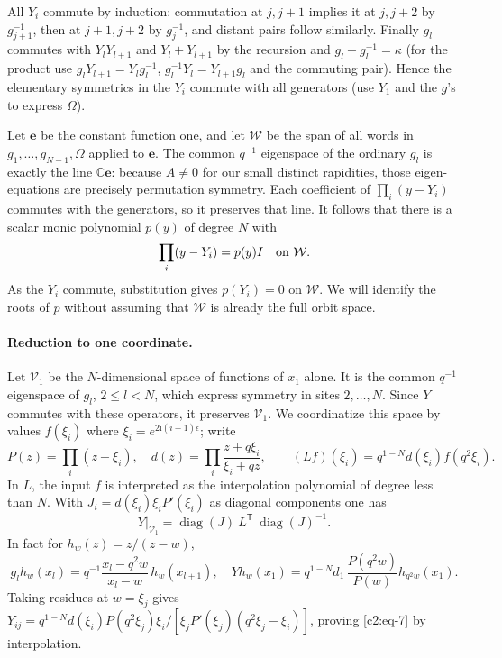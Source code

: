 All $Y_i$ commute by induction: commutation at \(j,j+1\) implies it at \(j,j+2\) by \(g_{j+1}^{-1}\), then at \(j+1,j+2\) by \(g_j^{-1}\), and distant pairs follow similarly. Finally $g_l$ commutes with \(Y_l Y_{l+1}\) and \(Y_l+Y_{l+1}\) by the recursion and \(g_l-g_l^{-1}=\kappa\) (for the product use \(g_lY_{l+1}=Y_l g_l^{-1}\), \(g_l^{-1}Y_l=Y_{l+1}g_l\) and the commuting pair). Hence the elementary symmetrics in the \(Y_i\) commute with all generators (use \(Y_1\) and the \(g\)'s to express \(\Omega\)).

Let $\mathbf e$ be the constant function one, and let $\mathcal W$
be the span of all words in $g_1,\ldots,g_{N-1},\Omega$ applied to
$\mathbf e$.  The common $q^{-1}$ eigenspace of the ordinary $g_l$ is
exactly the line $\mathbb C\mathbf e$: because $A\ne0$ for our small
distinct rapidities, those eigen-equations are precisely permutation
symmetry.  Each coefficient of $\prod_i(y-Y_i)$ commutes with the
generators, so it preserves that line.  It follows that there is a scalar
monic polynomial $p(y)$ of degree $N$ with
\[
 \prod_i(y-Y_i)=p(y)I\quad\hbox{on }\mathcal W.
\]
As the $Y_i$ commute, substitution gives $p(Y_i)=0$ on $\mathcal W$.
We will identify the roots of $p$ without assuming that $\mathcal W$
is already the full orbit space.

\paragraph{Reduction to one coordinate.}
Let $\mathcal V_1$ be the $N$-dimensional space of functions of $x_1$
alone.  It is the common $q^{-1}$ eigenspace of $g_l$, $2\le l<N$,
which express symmetry in sites $2,\ldots,N$.  Since $Y$ commutes with
these operators, it preserves $\mathcal V_1$.
We coordinatize this space by values \(f(\xi_i)\) where \(\xi_i=e^{2\mathrm i(i-1)\epsilon}\); write
\[
 P(z)=\prod_i(z-\xi_i),\quad d(z)=\prod_i\frac{z+q\xi_i}{\xi_i+qz},\qquad
 (L f)(\xi_i)=q^{1-N}d(\xi_i) f(q^2\xi_i).
\]
In \(L\), the input \(f\) is interpreted as the interpolation polynomial of degree less than \(N\). With \(J_i=d(\xi_i)\xi_i P'(\xi_i)\) as diagonal components one has
\begin{equation}
 Y|_{\mathcal V_1}=\operatorname{diag}(J)\ L^\mathsf{T}\ \operatorname{diag}(J)^{-1}.  \label{c2:eq-7}
\end{equation}
In fact for \(h_w(z)=z/(z-w)\),
\[
 g_l h_w(x_l)=q^{-1}\frac{x_l-q^2 w}{x_l-w}\,h_w(x_{l+1}),\quad
 Y h_w(x_1)=q^{1-N}d_1\,\frac{P(q^2 w)}{P(w)} h_{q^2 w}(x_1).
\]
Taking residues at \(w=\xi_j\) gives
\(Y_{ij}=q^{1-N}d(\xi_i)P(q^2\xi_j)\xi_i/[\xi_j P'(\xi_j)(q^2\xi_j-\xi_i)]\), proving \eqref{c2:eq-7} by interpolation.


